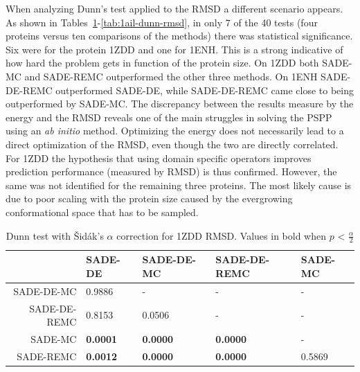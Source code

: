 When analyzing Dunn's test applied to the \ac{RMSD} a different scenario appears. As shown in
Tables~\ref{tab:1zdd-dunn-rmsd}-\ref{tab:1ail-dunn-rmsd}, in only 7 of the 40 tests
(four proteins versus ten comparisons of the methods) there was statistical significance.
Six were for the protein 1ZDD and one for 1ENH. This is a strong indicative
of how hard the problem gets in function of the protein size. On 1ZDD both SADE-MC and
SADE-REMC outperformed the other three methods. On 1ENH SADE-DE-REMC outperformed SADE-DE,
while SADE-DE-REMC came close to being outperformed by SADE-MC. 
The discrepancy between the results measure by the energy and the \ac{RMSD} reveals one of the
main struggles in solving the PSPP using an \textit{ab initio} method. Optimizing
the energy does not necessarily lead to a direct optimization of the \ac{RMSD}, even though
the two are directly correlated. For 1ZDD the hypothesis that using domain specific operators
improves prediction performance (measured by \ac{RMSD}) is thus confirmed. However, the same
was not identified for the remaining three proteins. The most likely cause is due to
poor scaling with the protein size caused by the evergrowing conformational space that has to
be sampled.


\begin{table}[ht!]
  \centering
  \begin{tabular}{ r | l | l | l | l } \cline{2-5}
              & SADE-DE         & SADE-DE-MC      & SADE-DE-REMC    & SADE-MC \\ \hline \hline
SADE-DE-MC    & 0.9886          & -               & -               & -       \\ \hline
SADE-DE-REMC  & 0.8153          & 0.0506          & -               & -       \\ \hline
SADE-MC       & \textbf{0.0001} & \textbf{0.0000} & \textbf{0.0000} & -       \\ \hline
SADE-REMC     & \textbf{0.0012} & \textbf{0.0000} & \textbf{0.0000} & 0.5869  \\ \hline \hline
  \end{tabular}
  \caption{Dunn test with \v{S}idák's $\alpha$ correction for 1ZDD \ac{RMSD}. Values in bold when $p$ < $\frac{\alpha}{2}$}
  \label{tab:1zdd-dunn-rmsd}
\end{table}

